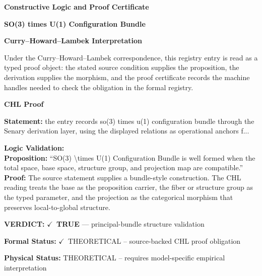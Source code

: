\clearpage
\begingroup\tzpsupportsetup
\noindent\textbf{\fontsize{10.8pt}{12.8pt}\selectfont [ID 0557] Constructive Logic and Proof Certificate}\par
\noindent\textbf{\fontsize{10pt}{12pt}\selectfont SO(3) times U(1) Configuration Bundle}\par
\vspace{0.45em}
\begingroup
\footnotesize
\setlength{\parskip}{0.22em}
\setlength{\parindent}{0pt}
\noindent\textbf{Curry--Howard--Lambek Interpretation}\par
Under the Curry--Howard--Lambek correspondence, this registry entry is read as a typed proof
object: the stated source condition supplies the proposition, the derivation supplies the
morphism, and the proof certificate records the machine handles needed to check the obligation
in the formal registry.

\vspace{0.45em}
\noindent\textbf{CHL Proof}\par
\textbf{Statement:} the entry records so(3) times u(1) configuration bundle through the Senary derivation
layer, using the displayed relations as operational anchors f...

\textbf{Logic Validation:}\\
\textbf{Proposition:} ``SO(3) \textbackslash{}times U(1) Configuration Bundle is well formed when the total space, base
space, structure group, and projection map are compatible.''\\
\textbf{Proof:} The source statement supplies a bundle-style construction. The CHL reading treats the
base as the proposition carrier, the fiber or structure group as the typed parameter,
and the projection as the categorical morphism that preserves local-to-global structure.

\textbf{VERDICT:} \ensuremath{\checkmark}\ \textbf{TRUE} --- principal-bundle structure validation

\textbf{Formal Status:} \ensuremath{\checkmark}\ THEORETICAL -- source-backed CHL proof obligation

\textbf{Physical Status:} THEORETICAL -- requires model-specific empirical interpretation
\par\vspace{0.45em}
\par
\ifTZPDarkEdition
{}
\fi
\endgroup
\endgroup
